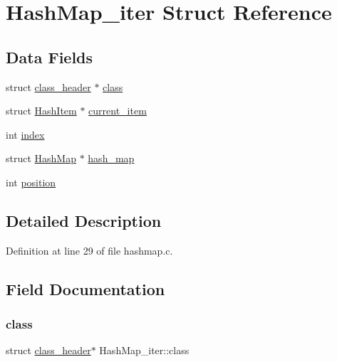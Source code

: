 \hypertarget{structHashMap__iter}{}\section{Hash\+Map\+\_\+iter Struct Reference}
\label{structHashMap__iter}
\subsection*{Data Fields}
\begin{DoxyCompactItemize}
\item 
struct \mbox{\hyperlink{structclass__header}{class\+\_\+header}} $\ast$ \mbox{\hyperlink{structHashMap__iter_a632cf034be2d2d879dc8903f0ec8e003}{class}}
\item 
struct \mbox{\hyperlink{structHashItem}{Hash\+Item}} $\ast$ \mbox{\hyperlink{structHashMap__iter_a298e8fda407d7e5baeff91ef0e312780}{current\+\_\+item}}
\item 
int \mbox{\hyperlink{structHashMap__iter_a0178778c493f8c8a3afb017cfc9904f0}{index}}
\item 
struct \mbox{\hyperlink{structHashMap}{Hash\+Map}} $\ast$ \mbox{\hyperlink{structHashMap__iter_a72fd08e2c359a826d7c367528c97da68}{hash\+\_\+map}}
\item 
int \mbox{\hyperlink{structHashMap__iter_ac3021d5a7412b03e27627aef37550c5a}{position}}
\end{DoxyCompactItemize}


\subsection{Detailed Description}


Definition at line 29 of file hashmap.\+c.



\subsection{Field Documentation}
\mbox{\label{structHashMap__iter_a632cf034be2d2d879dc8903f0ec8e003}} 
\subsubsection{\texorpdfstring{class}{class}}
{\footnotesize\ttfamily struct \mbox{\hyperlink{structclass__header}{class\+\_\+header}}$\ast$ Hash\+Map\+\_\+iter\+::class}



